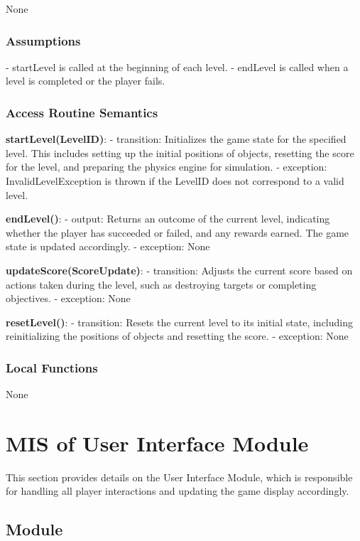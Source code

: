 \documentclass[12pt]{article}
\begin{document}
None

\subsubsection{Assumptions}

- startLevel is called at the beginning of each level.
- endLevel is called when a level is completed or the player fails.

\subsubsection{Access Routine Semantics}

\textbf{startLevel(LevelID)}:
- transition: Initializes the game state for the specified level. This includes setting up the initial positions of objects, resetting the score for the level, and preparing the physics engine for simulation.
- exception: InvalidLevelException is thrown if the LevelID does not correspond to a valid level.

\textbf{endLevel()}:
- output: Returns an outcome of the current level, indicating whether the player has succeeded or failed, and any rewards earned. The game state is updated accordingly.
- exception: None

\textbf{updateScore(ScoreUpdate)}:
- transition: Adjusts the current score based on actions taken during the level, such as destroying targets or completing objectives.
- exception: None

\textbf{resetLevel()}:
- transition: Resets the current level to its initial state, including reinitializing the positions of objects and resetting the score.
- exception: None

\subsubsection{Local Functions}

None
\section{MIS of User Interface Module}

This section provides details on the User Interface Module, which is responsible for handling all player interactions and updating the game display accordingly.

\subsection{Module}
\end{document}

